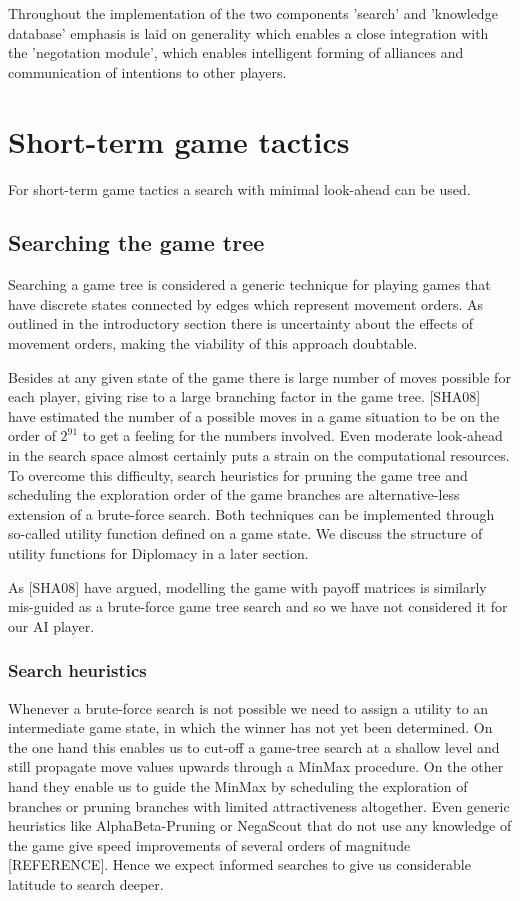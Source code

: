 \documentclass[12pt]{article}
\begin{document}
Throughout the implementation of the two components 'search' and 'knowledge
database' emphasis is laid on generality which enables a close integration
with the 'negotation module', which enables intelligent forming of 
alliances and communication of intentions to other players.

\section{Short-term game tactics}

For short-term game tactics a search with minimal look-ahead can be used.

\subsection{Searching the game tree}

Searching a game tree is considered a generic technique for playing 
games that have discrete states connected by edges which represent movement
orders. As outlined in the introductory section there is uncertainty about
the effects of movement orders, making the viability of this approach doubtable. 

Besides at any given state of the game there is large number of moves possible
for each player, giving rise to a large branching factor in the game tree. [SHA08]
have estimated the number of a possible moves in a game situation to be on the order
of $2^{91}$ to get a feeling for the numbers involved. Even moderate look-ahead in
the search space almost certainly puts a strain on the computational resources.
To overcome this difficulty, search heuristics for pruning the game tree and scheduling
the exploration order of the game branches are alternative-less extension of a
brute-force search. Both techniques can be implemented through so-called utility function
defined on a game state. We discuss the structure of utility functions for Diplomacy
in a later section.

As [SHA08] have argued, modelling the game with payoff matrices is similarly mis-guided
as a brute-force game tree search and so we have not considered it for our AI player.

\subsubsection{Search heuristics}

Whenever a brute-force search is not possible we need to assign a utility to an 
intermediate game state, in which the winner has not yet been determined. On the 
one hand this enables us to cut-off a game-tree search at a shallow level and
still propagate move values upwards through a MinMax procedure. On the other hand
they enable us to guide the MinMax by scheduling the exploration of branches or
pruning branches with limited attractiveness altogether. Even generic heuristics
like AlphaBeta-Pruning or NegaScout that do not use any knowledge of the game give
speed improvements of several orders of magnitude [REFERENCE]. Hence we expect
informed searches to give us considerable latitude to search deeper. 
\end{document}
